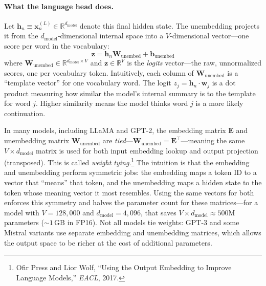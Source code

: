 \paragraph{What the language head does.} Let $\mathbf{h}_n \equiv \mathbf{x}_n^{(L)} \in \mathbb{R}^{d_{\text{model}}}$ denote this final hidden state. The unembedding projects it from the $d_{\text{model}}$-dimensional internal space into a $V$-dimensional vector---one score per word in the vocabulary:
\begin{equation}
\label{eq:unembedding}
\mathbf{z} = \mathbf{h}_n \mathbf{W}_{\text{unembed}} + \mathbf{b}_{\text{unembed}}
\end{equation}
where $\mathbf{W}_{\text{unembed}} \in \mathbb{R}^{d_{\text{model}} \times V}$ and $\mathbf{z} \in \mathbb{R}^V$ is the \emph{logits} vector---the raw, unnormalized scores, one per vocabulary token. Intuitively, each column of $\mathbf{W}_{\text{unembed}}$ is a ``template vector'' for one vocabulary word. The logit $z_j = \mathbf{h}_n \cdot \mathbf{w}_j$ is a dot product measuring how similar the model's internal summary is to the template for word $j$. Higher similarity means the model thinks word $j$ is a more likely continuation.

%
In many models, including LLaMA and GPT-2, the embedding matrix $\mathbf{E}$ and unembedding matrix $\mathbf{W}_{\text{unembed}}$ are \emph{tied}---$\mathbf{W}_{\text{unembed}} = \mathbf{E}^\top$---meaning the same $V \times d_{\text{model}}$ matrix is used for both input embedding lookup and output projection (transposed). This is called \emph{weight tying}.\footnote{Ofir Press and Lior Wolf, ``Using the Output Embedding to Improve Language Models,'' \emph{EACL}, 2017.} The intuition is that the embedding and unembedding perform symmetric jobs: the embedding maps a token ID to a vector that ``means'' that token, and the unembedding maps a hidden state to the token whose meaning vector it most resembles. Using the same vectors for both enforces this symmetry and halves the parameter count for these matrices---for a model with $V = 128{,}000$ and $d_{\text{model}} = 4{,}096$, that saves $V \times d_{\text{model}} \approx 500$M parameters (${\sim}1$\,GB in FP16). Not all models tie weights: GPT-3 and some Mistral variants use separate embedding and unembedding matrices, which allows the output space to be richer at the cost of additional parameters.

